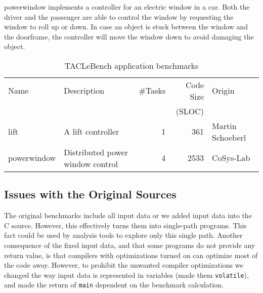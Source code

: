 \documentclass[a4paper,UKenglish]{oasics-v2016}
\newcommand{\todo}[1]{{\emph{TODO: #1}}}
\newcommand{\code}[1]{{\small{\texttt{#1}}}}
\renewcommand{\todo}[1]{}
\begin{document}
powerwindow implements a controller for an electric window in a car.
Both the driver and the passenger are able to control the window by 
requesting the window to roll up or down.
In case an object is stuck between the window and the doorframe,
the controller will move the window down to avoid damaging the object.

\begin{table}
\centering
\caption{\label{tab:bench_app}TACLeBench application benchmarks}
\begin{tabular}{lL{5cm}rrR{2cm}}
\toprule
Name & Description & \#Tasks & Code Size & Origin\\

     &             &         &     (SLOC) & \\ \midrule
lift & A lift controller & 1 & 361 & Martin Schoeberl\\
powerwindow & Distributed power window control & 4 & 2533 & CoSys-Lab \\
\bottomrule
\end{tabular}
\end{table}

\subsection{Issues with the Original Sources}


\todo{Show the issues with code snippets. Or the difference with the original one
and the updated one with patmos-clang -O3 and pasim.}

\todo{Show how compiler optimizations optimized away the original code and how we fixed this}

The original benchmarks include all input data or we added input data into the C source.
However, this effectively turns them into single-path programs.
This fact could be used by analysis tools to explore only this single path.
Another consequence of the fixed
input data, and that some programs do not provide
any return value, is that compilers with optimizations turned on can optimize
most of the code away.
However, to prohibit the unwanted compiler optimizations we changed
the way input data is represented in variables (made them \code{volatile}),
and made the return of \code{main} dependent on the benchmark calculation.

\end{document}
